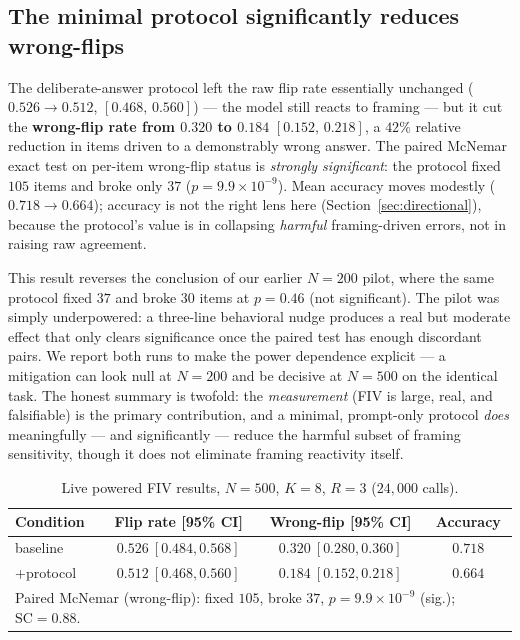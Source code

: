 \documentclass[10pt]{article}
\begin{document}
\subsection{The minimal protocol significantly reduces wrong-flips}\label{sec:protocolresult}
The deliberate-answer protocol left the raw flip rate essentially unchanged
($0.526\!\to\!0.512$, $[0.468,\,0.560]$) --- the model still reacts to framing ---
but it cut the \textbf{wrong-flip rate from $0.320$ to $0.184$} $[0.152,\,0.218]$,
a $42\%$ relative reduction in items driven to a demonstrably wrong answer. The
paired McNemar exact test on per-item wrong-flip status is \emph{strongly
significant}: the protocol fixed $105$ items and broke only $37$
($p=9.9\times10^{-9}$). Mean accuracy moves modestly ($0.718\!\to\!0.664$); accuracy
is not the right lens here (Section~\ref{sec:directional}), because the protocol's
value is in collapsing \emph{harmful} framing-driven errors, not in raising raw
agreement.

This result reverses the conclusion of our earlier $N{=}200$ pilot, where the same
protocol fixed $37$ and broke $30$ items at $p=0.46$ (not significant). The pilot
was simply underpowered: a three-line behavioral nudge produces a real but
moderate effect that only clears significance once the paired test has enough
discordant pairs. We report both runs to make the power dependence explicit ---
a mitigation can look null at $N{=}200$ and be decisive at $N{=}500$ on the
identical task. The honest summary is twofold: the \emph{measurement} (FIV is
large, real, and falsifiable) is the primary contribution, and a minimal,
prompt-only protocol \emph{does} meaningfully --- and significantly --- reduce the
harmful subset of framing sensitivity, though it does not eliminate framing
reactivity itself.

\begin{table}[htbp]\centering\small
\begin{tabular}{lccc}
\toprule
Condition & Flip rate [95\% CI] & Wrong-flip [95\% CI] & Accuracy\\
\midrule
baseline & $0.526\ [0.484,0.568]$ & $0.320\ [0.280,0.360]$ & $0.718$\\
+protocol & $0.512\ [0.468,0.560]$ & $0.184\ [0.152,0.218]$ & $0.664$\\
\midrule
\multicolumn{4}{l}{\small Paired McNemar (wrong-flip): fixed $105$, broke $37$, $p=9.9\times10^{-9}$ (sig.); $\mathrm{SC}=0.88$.}\\
\bottomrule
\end{tabular}
\caption{Live powered FIV results, $N{=}500$, $K{=}8$, $R{=}3$ ($24{,}000$ calls).}
\end{table}
\end{document}
